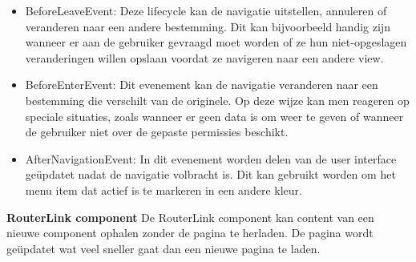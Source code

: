\begin{itemize}
	\item BeforeLeaveEvent: Deze lifecycle kan de navigatie uitstellen, annuleren of veranderen naar een andere bestemming. Dit kan bijvoorbeeld handig zijn wanneer er aan de gebruiker gevraagd moet worden of ze hun niet-opgeslagen veranderingen willen opslaan voordat ze navigeren naar een andere view. 
	\item BeforeEnterEvent: Dit evenement kan de navigatie veranderen naar een bestemming die verschilt van de originele. Op deze wijze kan men reageren op speciale situaties, zoals wanneer er geen data is om weer te geven of wanneer de gebruiker niet over de gepaste permissies beschikt.
	\item AfterNavigationEvent: In dit evenement worden delen van de user interface geüpdatet nadat de navigatie volbracht is. Dit kan gebruikt worden om het menu item dat actief is te markeren in een andere kleur.
\end{itemize}

\textbf{RouterLink component} \hspace{1cm} De RouterLink component kan content van een nieuwe component ophalen zonder de pagina te herladen. De pagina wordt geüpdatet wat veel sneller gaat dan een nieuwe pagina te laden. 

